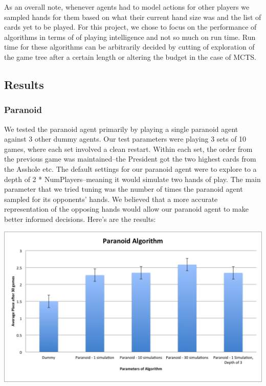 \documentclass[11pt]{article}
\begin{document}
As an overall note, whenever agents had to model actions for other players we sampled hands for them based on what their current hand size was and the list of cards yet to be played. For this project, we chose to focus on the performance of algorithms in terms of of playing intelligence and not so much on run time. Run time for these algorithms can be arbitrarily decided by cutting of exploration of the game tree after a certain length or altering the budget in the case of MCTS.

\subsection{Results}

\subsubsection{Paranoid}

We tested the paranoid agent primarily by playing a single paranoid agent against 3 other dummy agents. Our test parameters were playing 3 sets of 10 games, where each set involved a clean restart. Within each set, the order from the previous game was maintained--the President got the two highest cards from the Asshole etc. The default settings for our paranoid agent were to explore to a depth of 2 * NumPlayers--meaning it would simulate two hands of play. The main parameter that we tried tuning was the number of times the paranoid agent sampled for its opponents' hands. We believed that a more accurate representation of the opposing hands would allow our paranoid agent to make better informed decisions. Here's are the results:

\begin{center}
\includegraphics[width=\textwidth]{Paranoid.png}
\end{center}
\end{document}
